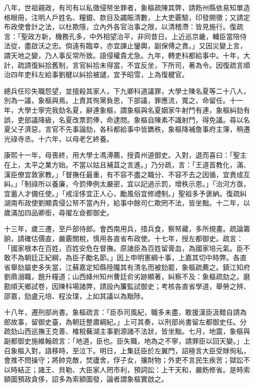 \begin{pinyinscope}
八年，世祖親政，有司有以私徵侵帑坐罪者，象樞疏陳其弊，請飭州縣依易知單造格眼冊，注明人戶姓名、糧銀、款目及蠲賑清數，上大吏覈驗，印發開徵；又請定布政使會計之法，以杜欺隱，立內外各官治事之限，以清稽滯：皆見施行。復疏言：「聖政方新，機務孔多，中外相望治平，非同昔日。上近巡京畿，輔臣當陪侍法從，盡啟沃之忠。倘遠有臨幸，亦宜諫止鑾輿，副保傅之責。」又因災變上言，謂天地之變，乃人事反常所致。語侵權貴尤急。九年，轉吏科都給事中。十年，大計，疏請復糾拾舊制，言官糾拾未得當，不宜反坐，下所司，著為令。因復疏言順治四年吏科左給事劉楗以糾拾被譴，宜予昭雪，上為復楗官。

總兵任珍失職怨望，並擅殺其家人，下九卿科道議罪，大學士陳名夏等二十八人，別為一議，象樞與焉。上責其徇黨負恩，下部議，罪應流，寬之，命留任。十一年，大學士寧完我劾名夏，辭連象樞，謂象樞與名夏姻家牛射鬥有連，象樞糾劾有誤，吏部議降級，名夏改票罰俸，命逮問。象樞自陳素不識射鬥，得免議。尋以名夏父子濟惡，言官不先事論劾，各科都給事中皆鐫秩，象樞降補詹事府主簿，稍遷光祿寺丞。十六年，以母老乞終養。

康熙十一年，母喪終，用大學士馮溥薦，授貴州道御史。入對，退而喜曰：「聖主在上，太平之業方始。不當以姑且補苴之言進。」乃分疏，言：「王道首教化，滿、漢臣僚宜敦家教。」「督撫任最重，有不容不盡之職分、不容不去之因循，宜責成互糾。」「制祿所以養廉，今罰俸例太嚴密，宜以記過示罰，增秩示恩。」「治河方亟，宜蓄人才備任使。」「戒淫侈宜正人心，勵風俗宜修禮制。」聖祖多予褒納。復疏糾湖南布政使劉顯貴侵公帑不當內升，給事中餘司仁欺罔不法，皆坐黜。十二年，以歲滿加四品卿銜，尋擢左僉都御史。

十三年，歲三遷，至戶部侍郎。會西南用兵，措兵食，察帑藏，多所規畫。疏論籌餉，請確估價直，嚴覈關稅，慎用各直省布政使。十七年，授左都御史。疏言：「國家根本在百姓，百姓安危在督撫。原諸臣為百姓留膏血，為國家培元氣。臣不敢不為朝廷正紀綱，為臣子勵名節。」因上申明憲綱十事，上嘉其切中時弊。各直省舉劾屬吏多失當，江蘇嘉定知縣陸隴其有清名而被劾罷，象樞疏薦之。鎮江知府劉鼎溺職，題升糧道；山西絳州知州曹廷俞劣跡顯著，糾察不及：象樞疏劾之。磨勘順天鄉試卷，因陳科場諸弊，請設內簾監試御史；考核各直省學道，舉勞之辨、邵嘉，劾盧元培、程汝璞，上如其議以為黜陟。

十八年，遷刑部尚書。象樞疏言：「臣忝司風紀，職多未盡，敢援漢臣汲黯自請為郎故事，留御史臺，為朝廷整肅綱紀。」上可其奏，以刑部尚書留左都御史任。分疏劾山西巡撫王克善、榷稅蕪湖主事劉源諸不法狀，皆坐黜。七月，地震，象樞與副都御史施維翰疏言：「地道，臣也。臣失職，地為之不寧，請罪臣以回天變。」上召象樞入對，語移時，至泣下。明日，上集廷臣於左翼門，詔極言大臣受賕徇私，會推不問操守；將帥克敵，焚廬舍，俘子女，攘財物；外吏不言民生疾苦；獄訟不以時結正；諸王、貝勒、大臣家人罔市利，預詞訟：上干天和，嚴飭修省。是時索額圖預政貪侈，詔多為索額圖發，論者謂象樞實啟之。


\end{pinyinscope}
